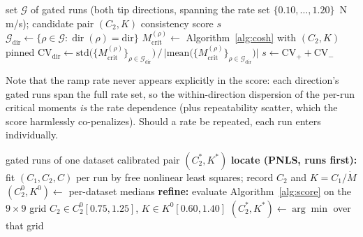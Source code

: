 \documentclass[10pt]{article}
\begin{document}
\begin{algorithm}[h]
\caption{Ramp-invariance consistency score}
\label{alg:score}
\begin{algorithmic}[1]
\Require set $\mathcal{G}$ of gated runs (both tip directions, spanning
  the rate set $\{0.10,\dots,1.20\}$~N\,m/s); candidate pair $(C_2, K)$
\Ensure consistency score $s$ 
  \State $\mathcal{G}_{\mathrm{dir}} \gets \{\rho \in \mathcal{G} :
    \operatorname{dir}(\rho) = \mathrm{dir}\}$
    \State $M_{\mathrm{crit}}^{(\rho)} \gets$
      Algorithm~\ref{alg:cosh} with $(C_2, K)$ pinned
  \EndFor
  \State $\mathrm{CV}_{\mathrm{dir}} \gets
    \mathrm{std}\bigl(\{M_{\mathrm{crit}}^{(\rho)}\}_{\rho\in
    \mathcal{G}_{\mathrm{dir}}}\bigr)
    \,/\, \bigl|\mathrm{mean}\bigl(\{M_{\mathrm{crit}}^{(\rho)}\}_{\rho\in
    \mathcal{G}_{\mathrm{dir}}}\bigr)\bigr|$
\EndFor
\State \Return $s \gets \mathrm{CV}_{+} + \mathrm{CV}_{-}$
\end{algorithmic}
\end{algorithm}

Note that the ramp rate never appears explicitly in the score:
each direction's gated runs span the full rate set, so the
within-direction dispersion of the per-run critical moments \emph{is}
the rate dependence (plus repeatability scatter, which the score
harmlessly co-penalizes). Should a rate be repeated, each run enters
individually.

\begin{algorithm}[h]
\caption{Effective-constant calibration (PNLS-located, then refined)}
\label{alg:calib}
\begin{algorithmic}[1]
\Require gated runs of one dataset
\Ensure calibrated pair $(C_2^\ast, K^\ast)$
\State \textbf{locate (PNLS, runs first):} fit $(C_1, C_2, C)$ per run
  by free nonlinear least squares; record $C_2$ and $K = C_1/\dot M$
\State $(C_2^{0}, K^{0}) \gets$ per-dataset medians
\State \textbf{refine:} evaluate Algorithm~\ref{alg:score} on the
  $9{\times}9$ grid
  $C_2 \in C_2^{0}[0.75, 1.25]$, $K \in K^{0}[0.60, 1.40]$
\State $(C_2^\ast, K^\ast) \gets \arg\min$ over that grid
\end{algorithmic}
\end{algorithm}
\end{document}
